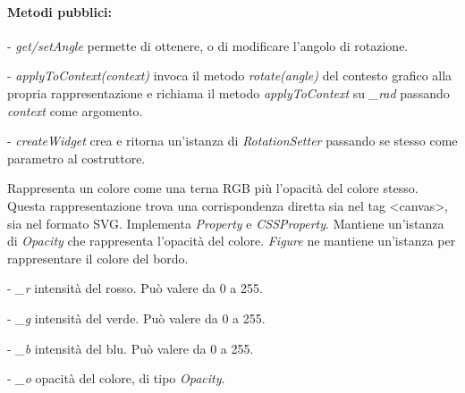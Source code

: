 \paragraph{Metodi pubblici:}
\begin{elencopuntato}[\subsubsecindent]
\item[-] \textit{get/setAngle} permette di ottenere, o di modificare l'angolo di rotazione.
\item[-] \textit{applyToContext(context)} invoca il metodo \textit{rotate(angle)} del contesto grafico alla propria rappresentazione e richiama il metodo \textit{applyToContext} su \textit{{\_}rad} passando \textit{context} come argomento.
\item[-] \textit{createWidget} crea e ritorna un'istanza di \textit{RotationSetter} passando se stesso come parametro al costruttore.
\end{elencopuntato}

Rappresenta un colore come una terna RGB pi\`u l'opacit\`a del colore stesso. Questa rappresentazione trova una corrispondenza diretta sia nel tag <canvas>, sia nel formato SVG.
Implementa \textit{Property} e \textit{CSSProperty}. Mantiene un'istanza di \textit{Opacity} che rappresenta l'opacit\`a del colore.
\textit{Figure} ne mantiene un'istanza per rappresentare il colore del bordo.
\begin{elencopuntato}[\subsubsecindent]
\item[-] \textit{\_r} intensit\`a del rosso. Pu\`o valere da 0 a 255.
\item[-] \textit{\_g} intensit\`a del verde. Pu\`o valere da 0 a 255.
\item[-] \textit{\_b} intensit\`a del blu. Pu\`o valere da 0 a 255.
\item[-] \textit{\_o} opacit\`a del colore, di tipo \textit{Opacity}.
\end{elencopuntato}

